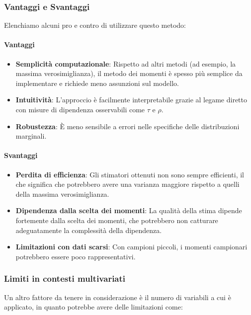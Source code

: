 \documentclass[%
	corpo=11pt,
    twoside,
    stile=classica,
    oldstyle,
    tipotesi=custom,
    greek,
    evenboxes,
]{toptesi}
\begin{document}
\subsubsection{Vantaggi e Svantaggi}

Elenchiamo alcuni pro e contro di utilizzare questo metodo:

\paragraph{Vantaggi}
\begin{itemize}
	\item \textbf{Semplicità computazionale}: Rispetto ad altri metodi (ad esempio, la massima verosimiglianza), il metodo dei momenti è spesso più semplice da implementare e richiede meno assunzioni sul modello.
	\item \textbf{Intuitività}: L’approccio è facilmente interpretabile grazie al legame diretto con misure di dipendenza osservabili come \( \tau \) e \( \rho \).
	\item \textbf{Robustezza}: È meno sensibile a errori nelle specifiche delle distribuzioni marginali.
\end{itemize}

\paragraph{Svantaggi}
\begin{itemize}
	\item \textbf{Perdita di efficienza}: Gli stimatori ottenuti non sono sempre efficienti, il che significa che potrebbero avere una varianza maggiore rispetto a quelli della massima verosimiglianza.
	\item \textbf{Dipendenza dalla scelta dei momenti}: La qualità della stima dipende fortemente dalla scelta dei momenti, che potrebbero non catturare adeguatamente la complessità della dipendenza.
	\item \textbf{Limitazioni con dati scarsi}: Con campioni piccoli, i momenti campionari potrebbero essere poco rappresentativi.
\end{itemize}

\subsubsection{Limiti in contesti multivariati}

Un altro fattore da tenere in considerazione è il numero di variabili a cui è applicato, in quanto potrebbe avere delle limitazioni come:
\end{document}
